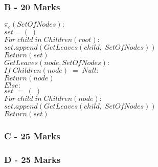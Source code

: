 \documentclass[paper=a4, fontsize=11pt]{scrartcl}
\newcommand\tab[1][1cm]{\hspace*{#1}}
\numberwithin{equation}{section}		%
\numberwithin{figure}{section}			%
\numberwithin{table}{section}				%
\begin{document}
\subsubsection*{B - 20 Marks}

\iffalse
Expand the partition step (given below) in pseudocode
compute πC = S1, S2, . . . Sr;
\fi


$\pi_c(SetOfNodes):$\\
\tab$set = (\;)$\\
\tab$For\;child\;in\;Children(root):$\\
\tab\tab$set.append(GetLeaves(child,\;SetOfNodes))$\\
\tab$Return(set)$ \\


$GetLeaves(node,SetOfNodes):$\\
\tab$If\;Children(node)\;=\;Null:$\\
\tab\tab$Return(node)$\\
\tab$Else:$\\
\tab\tab$set\;=\;(\;)$\\
\tab\tab$For\;child\;in\;Children(node):$\\
\tab\tab\tab$set.append(GetLeaves(child,\;SetOfNodes))$\\
\tab\tab$Return(set)$

\subsubsection*{C - 25 Marks}

\iffalse
Write a recurrence that expresses the running time of Build depending on the
number of different leaf-labels n and the number of constraints m. Use it to
estimate the running time of the algorithm assuming that the partitioning step
runs in time f (n, m) for some function monotonically nondecreasing function f.
\fi



\subsubsection*{D - 25 Marks}

\iffalse
Run the algorithm on the following set of constraints
(e, f) < (k, d) (c, l) < (g, k)
(c, h) < (a, n) (g, b) < (g, i)
(j, n) < (j, l) (g, i) < (d, m)
(c, a) < (f, h) (c, h) < (c, a)
(j, l) < (e, n) (e, f) < (h, l)
(n, l) < (a, f) (j, l) < (j, a)
(d, i) < (k, n) (k, m) < (e, i)
(d, i) < (g, i) (j, n) < (j, f).
You should show the partitioning and the recursive calls at each stage.
\fi
\end{document}
